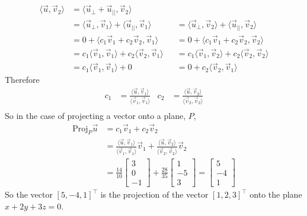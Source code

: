 \begin{example}
\begin{align*}
\langle \vec{u}, \vec{v}_2 \rangle & = \langle \vec{u}_{\perp} + \vec{u}_{||}, \vec{v}_2 \rangle \\
& = \langle \vec{u}_{\perp}, \vec{v}_1 \rangle + \langle \vec{u}_{||}, \vec{v}_1 \rangle &
& = \langle \vec{u}_{\perp}, \vec{v}_2 \rangle + \langle \vec{u}_{||}, \vec{v}_2 \rangle \\
& = 0 + \langle c_1 \vec{v}_1 + c_2 \vec{v}_2 ,\vec{v}_1 \rangle &
& = 0 + \langle c_1 \vec{v}_1 + c_2 \vec{v}_2 ,\vec{v}_2 \rangle \\
& = c_1 \langle \vec{v}_1, \vec{v}_1 \rangle + c_2 \langle \vec{v}_2, \vec{v}_1 \rangle &
& = c_1 \langle \vec{v}_1, \vec{v}_2 \rangle + c_2 \langle \vec{v}_2, \vec{v}_2 \rangle \\
& = c_1 \langle \vec{v}_1, \vec{v}_1 \rangle + 0 &
& = 0 + c_2 \langle \vec{v}_2, \vec{v}_1 \rangle 
\end{align*}
Therefore
\begin{align*}
c_1 & = \frac{\langle \vec{u},\vec{v}_1 \rangle}{\langle \vec{v}_1, \vec{v}_1 \rangle} &
c_2 & = \frac{\langle \vec{u},\vec{v}_2 \rangle}{\langle \vec{v}_2, \vec{v}_2 \rangle} \\
\end{align*}
So in the case of projecting a vector onto a plane, $P$,
\begin{align*}
\text{Proj}_{P} \vec{u} & = c_1 \vec{v}_1 + c_2 \vec{v}_2 \\
& = \frac{\langle \vec{u},\vec{v}_1 \rangle}{\langle \vec{v}_1, \vec{v}_1 \rangle} \vec{v}_1 +
\frac{\langle \vec{u},\vec{v}_2 \rangle}{\langle \vec{v}_2, \vec{v}_2 \rangle} \vec{v}_2 \\
& = \frac{14}{10} \begin{bmatrix}
3 \\ 0 \\ -1 
\end{bmatrix} + \frac{28}{35} \begin{bmatrix}
1 \\ -5 \\ 3
\end{bmatrix} = \begin{bmatrix}
5 \\-4 \\ 1
\end{bmatrix}
\end{align*} 
So the vector $[5,-4,1]^{\intercal}$ is the projection of the vector $[1,2,3]^{\intercal}$ onto the plane $x+2y+3z=0$.  
\end{example}






